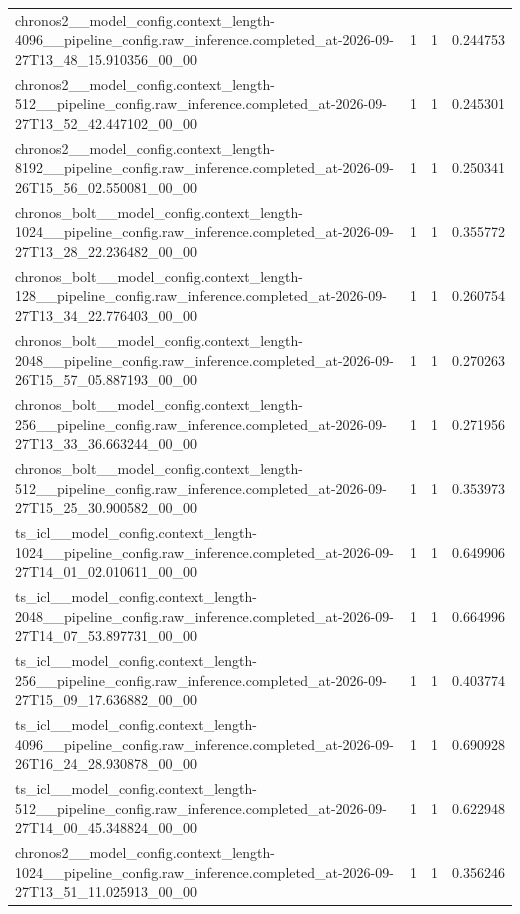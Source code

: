 \begin{tabular}{llll}
chronos2\_\_model\_config.context\_length-4096\_\_pipeline\_config.raw\_inference.completed\_at-2026-09-27T13\_48\_15.910356\_00\_00 & 1 & 1 & 0.244753 \\
chronos2\_\_model\_config.context\_length-512\_\_pipeline\_config.raw\_inference.completed\_at-2026-09-27T13\_52\_42.447102\_00\_00 & 1 & 1 & 0.245301 \\
chronos2\_\_model\_config.context\_length-8192\_\_pipeline\_config.raw\_inference.completed\_at-2026-09-26T15\_56\_02.550081\_00\_00 & 1 & 1 & 0.250341 \\
chronos\_bolt\_\_model\_config.context\_length-1024\_\_pipeline\_config.raw\_inference.completed\_at-2026-09-27T13\_28\_22.236482\_00\_00 & 1 & 1 & 0.355772 \\
chronos\_bolt\_\_model\_config.context\_length-128\_\_pipeline\_config.raw\_inference.completed\_at-2026-09-27T13\_34\_22.776403\_00\_00 & 1 & 1 & 0.260754 \\
chronos\_bolt\_\_model\_config.context\_length-2048\_\_pipeline\_config.raw\_inference.completed\_at-2026-09-26T15\_57\_05.887193\_00\_00 & 1 & 1 & 0.270263 \\
chronos\_bolt\_\_model\_config.context\_length-256\_\_pipeline\_config.raw\_inference.completed\_at-2026-09-27T13\_33\_36.663244\_00\_00 & 1 & 1 & 0.271956 \\
chronos\_bolt\_\_model\_config.context\_length-512\_\_pipeline\_config.raw\_inference.completed\_at-2026-09-27T15\_25\_30.900582\_00\_00 & 1 & 1 & 0.353973 \\
ts\_icl\_\_model\_config.context\_length-1024\_\_pipeline\_config.raw\_inference.completed\_at-2026-09-27T14\_01\_02.010611\_00\_00 & 1 & 1 & 0.649906 \\
ts\_icl\_\_model\_config.context\_length-2048\_\_pipeline\_config.raw\_inference.completed\_at-2026-09-27T14\_07\_53.897731\_00\_00 & 1 & 1 & 0.664996 \\
ts\_icl\_\_model\_config.context\_length-256\_\_pipeline\_config.raw\_inference.completed\_at-2026-09-27T15\_09\_17.636882\_00\_00 & 1 & 1 & 0.403774 \\
ts\_icl\_\_model\_config.context\_length-4096\_\_pipeline\_config.raw\_inference.completed\_at-2026-09-26T16\_24\_28.930878\_00\_00 & 1 & 1 & 0.690928 \\
ts\_icl\_\_model\_config.context\_length-512\_\_pipeline\_config.raw\_inference.completed\_at-2026-09-27T14\_00\_45.348824\_00\_00 & 1 & 1 & 0.622948 \\
chronos2\_\_model\_config.context\_length-1024\_\_pipeline\_config.raw\_inference.completed\_at-2026-09-27T13\_51\_11.025913\_00\_00 & 1 & 1 & 0.356246 \\

\end{tabular}
